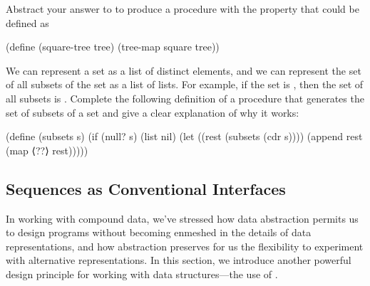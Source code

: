\begin{exercise}
	\label{Exercise 2.31}
	Abstract your answer to  to produce a procedure  with the property that  could be defined as
	\begin{scheme}
	  (define (square-tree tree) (tree-map square tree))
	\end{scheme}
\end{exercise}



\begin{exercise}
	\label{Exercise 2.32}
	We can represent a set as a list of distinct elements, and we can represent the set of all subsets of the set as a list of lists.
	For example, if the set is , then the set of all subsets is .
	Complete the following definition of a procedure that generates the set of subsets of a set and give a clear explanation of why it works:
	\begin{scheme}
	  (define (subsets s)
	    (if (null? s)
	        (list nil)
	        (let ((rest (subsets (cdr s))))
	          (append rest (map ⟨??⟩ rest)))))
	\end{scheme}
\end{exercise}



\subsection{Sequences as Conventional Interfaces}
\label{Section 2.2.3}

In working with compound data, we’ve stressed how data abstraction permits us to design programs without becoming enmeshed in the details of data representations, and how abstraction preserves for us the flexibility to experiment with alternative representations.
In this section, we introduce another powerful design principle for working with data structures---the use of .

